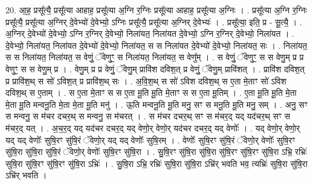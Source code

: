 \documentclass[17pt]{extarticle}
\begin{document}
20. आ॒ह॒ प्रसू᳚त्यै॒ प्रसू᳚त्या आहाह॒ प्रसू᳚त्या अ॒ग्नि र॒ग्निः प्रसू᳚त्या आहाह॒ प्रसू᳚त्या अ॒ग्निः । . प्रसू᳚त्या अ॒ग्नि र॒ग्निः प्रसू᳚त्यै॒ प्रसू᳚त्या अ॒ग्निर् दे॒वेभ्यो॑ दे॒वेभ्यो॒ ऽग्निः प्रसू᳚त्यै॒ प्रसू᳚त्या अ॒ग्निर् दे॒वेभ्यः॑ । . प्रसू᳚त्या॒ इति॒ प्र - सू॒त्यै॒ । . अ॒ग्निर् दे॒वेभ्यो॑ दे॒वेभ्यो॒ ऽग्नि र॒ग्निर् दे॒वेभ्यो॒ निला॑यत॒ निला॑यत दे॒वेभ्यो॒ ऽग्नि र॒ग्निर् दे॒वेभ्यो॒ निला॑यत । . दे॒वेभ्यो॒ निला॑यत॒ निला॑यत दे॒वेभ्यो॑ दे॒वेभ्यो॒ निला॑यत॒ स स निला॑यत दे॒वेभ्यो॑ दे॒वेभ्यो॒ निला॑यत॒ सः । . निला॑यत॒ स स निला॑यत॒ निला॑यत॒ स वेणुं॒ ॅवेणुꣳ॒॒ स निला॑यत॒ निला॑यत॒ स वेणु᳚म् । . स वेणुं॒ ॅवेणुꣳ॒॒ स स वेणु॒म् प्र प्र वेणुꣳ॒॒ स स वेणु॒म् प्र । . वेणु॒म् प्र प्र वेणुं॒ ॅवेणु॒म् प्रावि॑श दविश॒त् प्र वेणुं॒ ॅवेणु॒म् प्रावि॑शत् । . प्रावि॑श दविश॒त् प्र प्रावि॑श॒थ् स सो॑ ऽविश॒त् प्र प्रावि॑श॒थ् सः । . अ॒वि॒श॒थ् स सो॑ ऽविश दविश॒थ् स ए॒ता मे॒ताꣳ सो॑ ऽविश दविश॒थ् स ए॒ताम् । . स ए॒ता मे॒ताꣳ स स ए॒ता मू॒ति मू॒ति मे॒ताꣳ स स ए॒ता मू॒तिम् । . ए॒ता मू॒ति मू॒ति मे॒ता मे॒ता मू॒ति मन्वनू॒ति मे॒ता मे॒ता मू॒ति मनु॑ । . ऊ॒ति मन्वनू॒ति मू॒ति मनु॒ सꣳ स मनू॒ति मू॒ति मनु॒ सम् । . अनु॒ सꣳ स मन्वनु॒ स म॑चर दचर॒थ् स मन्वनु॒ स म॑चरत् । . स म॑चर दचर॒थ् सꣳ स म॑चर॒द् यद् यद॑चर॒थ् सꣳ स म॑चर॒द् यत् । . अ॒च॒र॒द् यद् यद॑चर दचर॒द् यद् वेणो॒र् वेणो॒र् यद॑चर दचर॒द् यद् वेणोः᳚ । . यद् वेणो॒र् वेणो॒र् यद् यद् वेणोः᳚ सुषि॒रꣳ सु॑षि॒रं ॅवेणो॒र् यद् यद् वेणोः᳚ सुषि॒रम् । . वेणोः᳚ सुषि॒रꣳ सु॑षि॒रं ॅवेणो॒र् वेणोः᳚ सुषि॒रꣳ सु॑षि॒रा सु॑षि॒रा सु॑षि॒रं ॅवेणो॒र् वेणोः᳚ सुषि॒रꣳ सु॑षि॒रा । . सु॒षि॒रꣳ सु॑षि॒रा सु॑षि॒रा सु॑षि॒रꣳ सु॑षि॒रꣳ सु॑षि॒रा ऽभ्रि॒ रभ्रिः॑ सुषि॒रा सु॑षि॒रꣳ सु॑षि॒रꣳ सु॑षि॒रा ऽभ्रिः॑ । . सु॒षि॒रा ऽभ्रि॒ रभ्रिः॑ सुषि॒रा सु॑षि॒रा ऽभ्रि॑र् भवति भव॒ त्यभ्रिः॑ सुषि॒रा सु॑षि॒रा ऽभ्रि॑र् भवति । \newline
\end{document}

